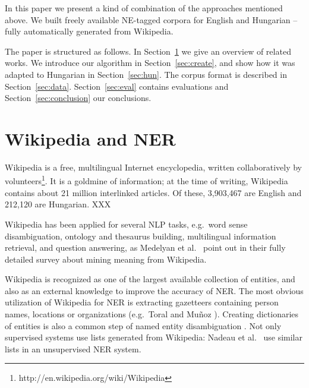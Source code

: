 \documentclass[11pt]{article}
\begin{document}


In this paper we present a kind of combination of the approaches mentioned above. We built freely available NE-tagged corpora for English and Hungarian -- fully automatically generated from Wikipedia. %

The paper is structured as follows. In Section~\ref{sec:related} we give an overview of related works. We introduce our algorithm in Section~\ref{sec:create}, and show how it was adapted to Hungarian in Section~\ref{sec:hun}. The corpus format is described in Section~\ref{sec:data}. Section~\ref{sec:eval} contains evaluations and Section~\ref{sec:conclusion} our conclusions.

\section{Wikipedia and NER}
\label{sec:related}

Wikipedia is a free, multilingual Internet encyclopedia, written collaboratively by volunteers\footnote{http://en.wikipedia.org/wiki/Wikipedia}. It is a goldmine of information; at the time of writing, Wikipedia contains about 21 million interlinked articles. Of these, 3,903,467 are English and 212,120 are Hungarian. XXX %

Wikipedia has been applied for several NLP tasks, e.g.~word sense disambiguation, ontology and thesaurus building, multilingual information retrieval, and question answering, as Medelyan et al.~ point out in their fully detailed survey about mining meaning from Wikipedia. 

Wikipedia is recognized as one of the largest available collection of entities, and also as an external knowledge to improve the accuracy of NER. The most obvious utilization of Wikipedia for NER is extracting gazetteers containing person names, locations or organizations (e.g.~Toral and Mu\~noz ). Creating dictionaries of entities is also a common step of named entity disambiguation \cite{Bunescu:06,Cucerzan:07}. Not only supervised systems use lists generated from Wikipedia: Nadeau et al.~ use similar lists in an unsupervised NER system. 
\end{document}
